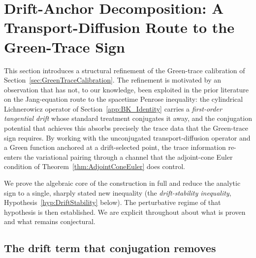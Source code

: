 \section{Drift-Anchor Decomposition: A Transport-Diffusion Route to the Green-Trace Sign}
\label{sec:DriftAnchor}

This section introduces a structural refinement of the Green-trace calibration of Section~\ref{sec:GreenTraceCalibration}. The refinement is motivated by an observation that has not, to our knowledge, been exploited in the prior literature on the Jang-equation route to the spacetime Penrose inequality: the cylindrical Lichnerowicz operator of Section~\ref{app:BK_Identity} carries a \emph{first-order tangential drift} whose standard treatment conjugates it away, and the conjugation potential that achieves this absorbs precisely the trace data that the Green-trace sign requires. By working with the unconjugated transport-diffusion operator and a Green function anchored at a drift-selected point, the trace information re-enters the variational pairing through a channel that the adjoint-cone Euler condition of Theorem~\ref{thm:AdjointConeEuler} does control.

We prove the algebraic core of the construction in full and reduce the analytic sign to a single, sharply stated new inequality (the \emph{drift-stability inequality}, Hypothesis~\ref{hyp:DriftStability} below). The perturbative regime of that hypothesis is then established. We are explicit throughout about what is proven and what remains conjectural.

\subsection{The drift term that conjugation removes}

